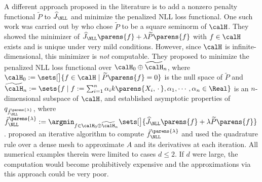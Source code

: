\documentclass[12pt]{article}
\theoremstyle{definition}
\theoremstyle{theorem}
\theoremstyle{remark}
\begin{document}
A different approach proposed in the literature is to add a nonzero penalty functional $\widetilde{P}$ to $\widehat{J}_{\NLL}$ and minimize the penalized NLL loss functional. One such work was carried out by \textcite{Gu1993-na} who chose $\widetilde{P}$ to be a square seminorm of $\calH$. They showed the minimizer of $\widehat{J}_{\NLL} \parens{f} + \lambda \widetilde{P} \parens{f}$ with $f \in \calH$ exists and is unique under very mild conditions. 
However, since $\calH$ is infinite-dimensional, this minimizer is \emph{not} computable. They proposed to minimize the penalized NLL loss functional over $\calH_{0} \oplus \widetilde{\calH}_n$, where $\calH_0 := \sets[\big]{f \in \calH \mid \widetilde{P} \parens{f} = 0}$ is the null space of $\widetilde{P}$ and $\widetilde{\calH}_n := \sets{f \mid f := \sum_{i=1}^n \alpha_i k \parens{X_i, \,\cdot\,}, \alpha_1, \cdots, \alpha_n \in \Real}$ is an $n$-dimensional subspace of $\calH$, and established asymptotic properties of $q_{\tilde{f}_{\NLL}^{\parens{\lambda}}}$, where $\tilde{f}_{\NLL}^{\parens{\lambda}} := \argmin_{f \in \calH_{0} \oplus \widetilde{\calH}_n} \sets[\big]{\widehat{J}_{\NLL} \parens{f} + \lambda \widetilde{P} \parens{f}}$. 
\textcite{Gu1993-lf} proposed an iterative algorithm to compute $\tilde{f}_{\NLL}^{\parens{\lambda}}$ and used the quadrature rule over a dense mesh to approximate $A$ and its derivatives at each iteration. All numerical examples therein were limited to cases $d \le 2$. If $d$ were large, the computation would become prohibitively expensive and the approximations via this approach could be very poor. 
\end{document}
